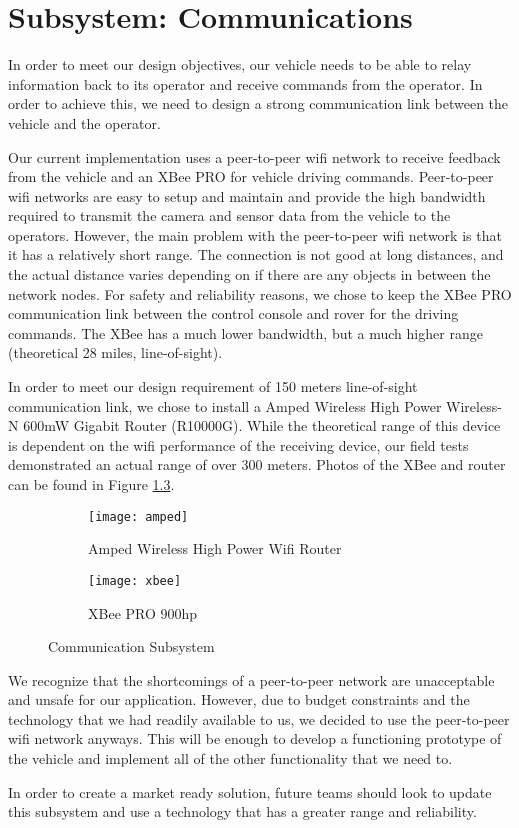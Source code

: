 \chapter{Subsystem: Communications} \label{chap:communications}

In order to meet our design objectives, our vehicle needs to be able to relay information back to its operator and receive commands from the operator.  In order to achieve this, we need to design a strong communication link between the vehicle and the operator.

Our current implementation uses a peer-to-peer wifi network to receive feedback from the vehicle and an XBee PRO for vehicle driving commands.  Peer-to-peer wifi networks are easy to setup and maintain and provide the high bandwidth required to transmit the camera and sensor data from the vehicle to the operators. However, the main problem with the peer-to-peer wifi network is that it has a relatively short range. The connection is not good at long distances, and the actual distance varies depending on if there are any objects in between the network nodes. For safety and reliability reasons, we chose to keep the XBee PRO communication link between the control console and rover for the driving commands. The XBee has a much lower bandwidth, but a much higher range (theoretical 28 miles, line-of-sight).

In order to meet our design requirement of 150 meters line-of-sight communication link, we chose to install a  Amped Wireless High Power Wireless-N 600mW Gigabit Router (R10000G). While the theoretical range of this device is dependent on the wifi performance of the receiving device, our field tests demonstrated an actual range of over 300 meters. Photos of the XBee and router can be found in Figure \ref{fig:test}.

\begin{figure}[H]
	\centering
	\begin{subfigure}{.5\textwidth}
		\centering
		\texttt{[image: amped]}
		\caption{Amped Wireless High Power Wifi Router}
		\label{fig:sub1}
	\end{subfigure}%
	\begin{subfigure}{.5\textwidth}
		\centering
		\texttt{[image: xbee]}
		\caption{XBee PRO 900hp}
		\label{fig:sub2}
	\end{subfigure}
	\caption{Communication Subsystem}
	\label{fig:test}
\end{figure}

We recognize that the shortcomings of a peer-to-peer network are unacceptable and unsafe for our application. However, due to budget constraints and the technology that we had readily available to us, we decided to use the peer-to-peer wifi network anyways. This will be enough to develop a functioning prototype of the vehicle and implement all of the other functionality that we need to.

In order to create a market ready solution, future teams should look to update this subsystem and use a technology that has a greater range and reliability.